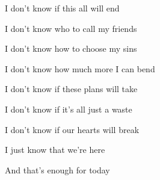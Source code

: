 \pagebreak

\begin{chorus*}
  I don't know if this all will end
  
  I don't know who to call my friends

  I don't know how to choose my sins

  I don't know how much more I can bend

  I don't know if these plans will take

  I don't know if it's all just a waste

  I don't know if our hearts will break

  I just know that we're here

  And that's enough for today
\end{chorus*}

